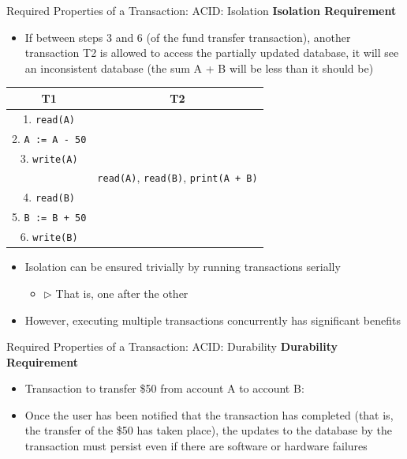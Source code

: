 \documentclass[aspectratio=169, xcolor=dvipsnames]{beamer}
\begin{document}
\begin{frame}{Required Properties of a Transaction: ACID: Isolation}
    \textbf{Isolation Requirement}
    \begin{itemize}[<+->]
        \item If between steps 3 and 6 (of the fund transfer transaction), another transaction T2 is allowed to access the partially updated database, it will see an inconsistent database (the sum A + B will be less than it should be)
    \end{itemize}
    
    \begin{center}
    \begin{tabular}{cc}
        T1 & T2 \\
        \midrule
        1. \texttt{read(A)} & \\
        2. \texttt{A := A - 50} & \\
        3. \texttt{write(A)} & \\
         & \texttt{read(A)}, \texttt{read(B)}, \texttt{print(A + B)} \\
        4. \texttt{read(B)} & \\
        5. \texttt{B := B + 50} & \\
        6. \texttt{write(B)} & \\
    \end{tabular}
    \end{center}
    
    \begin{itemize}[<+->]
        \item Isolation can be ensured trivially by running transactions serially
        \begin{itemize}[<+->]
            \item $\triangleright$ That is, one after the other
        \end{itemize}
        \item However, executing multiple transactions concurrently has significant benefits
    \end{itemize}
\end{frame}

\begin{frame}{Required Properties of a Transaction: ACID: Durability}
    \textbf{Durability Requirement}
    \begin{itemize}[<+->]
        \item Transaction to transfer \$50 from account A to account B:
        \item Once the user has been notified that the transaction has completed (that is, the transfer of the \$50 has taken place), the updates to the database by the transaction must persist even if there are software or hardware failures
    \end{itemize}
\end{frame}
\end{document}
